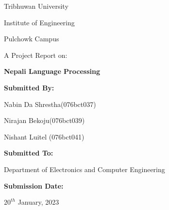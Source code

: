 \bigskip
\bigskip
\bigskip
\bigskip

\begin{center}

Tribhuwan University

Institute of Engineering

Pulchowk Campus

\bigskip
\bigskip
\bigskip
\bigskip
\bigskip
\bigskip
\bigskip
\bigskip

\noindent\makebox[\linewidth]
{\rule{15cm}{0.4pt}}
A Project Report on:

\textbf{\large Nepali Language Processing}
\noindent\makebox[\linewidth]
{\rule{15cm}{0.4pt}}

\bigskip
\bigskip
\bigskip
\bigskip
\bigskip
\bigskip
\bigskip
\bigskip
\textbf{Submitted By:}

Nabin Da Shrestha(076bct037)

Nirajan Bekoju(076bct039)

Nishant Luitel (076bct041)

\bigskip
\bigskip
\bigskip
\bigskip
\textbf{Submitted To:}

Department of Electronics and Computer Engineering

\bigskip
\bigskip
\bigskip
\bigskip
\textbf{Submission Date:} 

$20^{th}$ January, 2023

\end{center}
\clearpage
\tableofcontents
\clearpage
\listoffigures
\clearpage
\listoftables
\clearpage